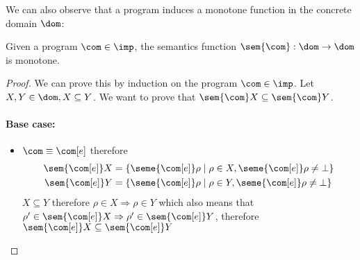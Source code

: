 We can also observe that a program induces a monotone function in the
concrete domain \(\dom\):

\begin{lemma}
  Given a program \(\com\in\imp\), the semantics function
  \(\sem{\com} : \dom \to \dom\) is monotone.
\end{lemma}

\begin{proof}
  We can prove this by induction on the program \(\com\in\imp\). Let
  \(X, Y\in\dom, X \subseteq Y\). We want to prove that
  \(\sem{\com}X \subseteq \sem{\com}Y\).

  \noindent
  \paragraph*{Base case: \\}
  \begin{itemize}
  \item \(\com \equiv \com[e]\) therefore
    \begin{align*}
      \sem{\com[e]}X & = \{\seme{\com[e]}\rho \mid \rho \in X , \seme{\com[e]}\rho \neq \bot\} \\
      \sem{\com[e]}Y & = \{\seme{\com[e]}\rho \mid \rho \in Y , \seme{\com[e]}\rho \neq \bot\} \\
    \end{align*}
    \(X\subseteq Y\) therefore \(\rho \in X \Rightarrow \rho \in Y\)
    which also means that
    \(\rho' \in \sem{\com[e]}X \Rightarrow \rho' \in \sem{\com[e]}Y\),
    therefore
    \(\sem{\com[e]}X \subseteq \sem{\com[e]}Y\)
  \end{itemize}

  \noindent

\end{proof}
